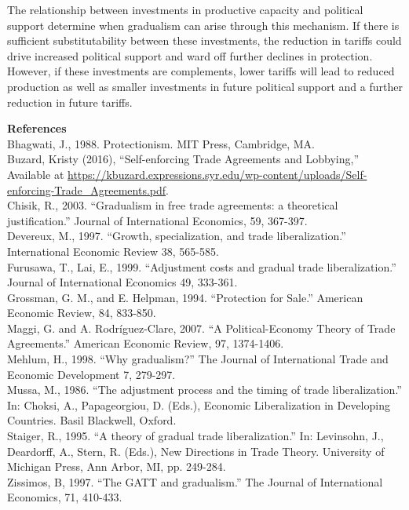 \documentclass[12pt]{article}
\begin{document}
The relationship between investments in productive capacity and political support determine when gradualism can arise through this mechanism. If there is sufficient substitutability between these investments, the reduction in tariffs could drive increased political support and ward off further declines in protection. However, if these investments are complements, lower tariffs will lead to reduced production as well as smaller investments in future political support and a further reduction in future tariffs.
				

\newpage
\noindent\large\textbf{References}\\

\noindent\normalsize Bhagwati, J., 1988. Protectionism. MIT Press, Cambridge, MA. \\

\noindent Buzard, Kristy (2016), ``Self-enforcing Trade Agreements and Lobbying,'' Available at \url{https://kbuzard.expressions.syr.edu/wp-content/uploads/Self-enforcing-Trade_Agreements.pdf}. \\

\noindent Chisik, R., 2003. ``Gradualism in free trade agreements: a theoretical justification.'' Journal of International Economics, 59, 367-397. \\

\noindent Devereux, M., 1997. ``Growth, specialization, and trade liberalization.'' International Economic Review
38, 565-585. \\

\noindent Furusawa, T., Lai, E., 1999. ``Adjustment costs and gradual trade liberalization.'' Journal of International
Economics 49, 333-361. \\

\noindent Grossman, G. M., and E. Helpman, 1994. ``Protection for Sale.'' American Economic Review, 84, 833-850. \\

\noindent Maggi, G. and A. Rodr\'{i}guez-Clare, 2007. ``A Political-Economy Theory of Trade Agreements.'' American Economic Review, 97, 1374-1406. \\

\noindent Mehlum, H., 1998. ``Why gradualism?'' The Journal of International Trade and Economic Development 7, 279-297. \\

\noindent Mussa, M., 1986. ``The adjustment process and the timing of trade liberalization.'' In: Choksi, A., Papageorgiou, D. (Eds.), Economic Liberalization in Developing Countries. Basil Blackwell, Oxford. \\

\noindent Staiger, R., 1995. ``A theory of gradual trade liberalization.'' In: Levinsohn, J., Deardorff, A., Stern, R.
(Eds.), New Directions in Trade Theory. University of Michigan Press, Ann Arbor, MI, pp. 249-284. \\

\noindent Zissimos, B, 1997. ``The GATT and gradualism.'' The Journal of International Economics, 71, 410-433.
\end{document}
